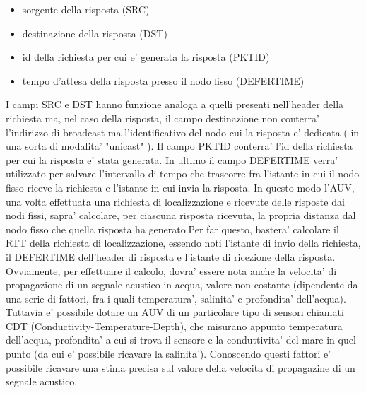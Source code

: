 \begin{itemize}
    \item sorgente della risposta (SRC)
    \item destinazione della risposta (DST)
    \item id della richiesta per cui e' generata la risposta (PKTID)
    \item tempo d'attesa della risposta presso il nodo fisso (DEFERTIME)
\end{itemize}
I campi SRC e DST hanno funzione analoga a quelli presenti nell'header della richiesta ma, nel caso della risposta, il campo destinazione non conterra' l'indirizzo di broadcast ma l'identificativo del nodo cui la risposta e' dedicata ( in una sorta di modalita' "unicast" ). Il campo PKTID conterra' l'id della richiesta per cui la risposta e' stata generata. In ultimo il campo DEFERTIME verra' utilizzato per salvare l'intervallo di tempo che trascorre fra l'istante in cui il nodo fisso riceve la richiesta e l'istante in cui invia la risposta.\newline
In questo modo l'AUV, una volta effettuata una richiesta di localizzazione e ricevute delle risposte dai nodi fissi, 
sapra' calcolare, per ciascuna risposta ricevuta, la propria distanza dal nodo fisso che quella risposta ha generato.\newline Per far questo, bastera' calcolare il RTT della richiesta di localizzazione,
essendo noti l'istante di invio della richiesta, il DEFERTIME dell'header di risposta  e  l'istante di ricezione della risposta. Ovviamente, per effettuare il calcolo, dovra' essere nota anche la velocita' di propagazione di un segnale acustico in acqua, valore non costante (dipendente da una serie di fattori, fra i quali temperatura', salinita' e profondita' dell'acqua). Tuttavia e' possibile dotare un AUV  di un particolare tipo di sensori chiamati CDT (Conductivity-Temperature-Depth), che misurano appunto temperatura dell'acqua, profondita' a cui si trova il sensore e la conduttivita' del mare in quel punto (da cui e' possibile ricavare la salinita'). Conoscendo  questi fattori e' possibile ricavare una stima precisa sul valore della velocita di propagazine di un segnale acustico. 

